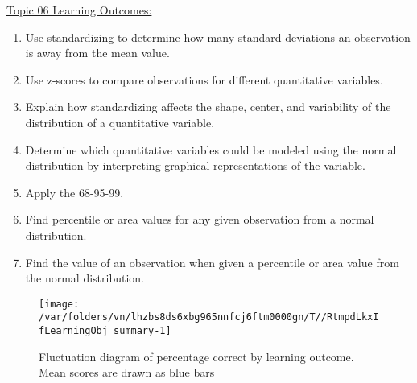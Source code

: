 \documentclass[12pt,english,nohyper]{tufte-handout}\usepackage[]{graphicx}\usepackage[]{color}
\newenvironment{knitrout}{}{} %
\begin{document}
\noindent
\underline{Topic 06 Learning Outcomes:}
\vspace{2mm}

\begin{fullwidth}
\begin{enumerate}[label=\Alph*.,itemsep=-\parsep,leftmargin=*]
  \item
Use standardizing to determine how many standard deviations an observation is away from the mean value.
\item Use z-scores to compare observations for different quantitative variables.
\item Explain how standardizing affects the shape, center, and variability of the distribution of a quantitative variable.
\item Determine which quantitative variables could be modeled using the normal distribution by interpreting graphical representations of the variable.
\item Apply the 68-95-99.
\item Find percentile or area values for any given observation from a normal distribution.
\item Find the value of an observation when given a percentile or area value from the normal distribution.

\end{enumerate}
\end{fullwidth}

\begin{knitrout}
\color{fgcolor}\begin{figure}
\texttt{[image: /var/folders/vn/lhzbs8ds6xbg965nnfcj6ftm0000gn/T//RtmpdLkxIfLearningObj\_summary-1]} \caption[Fluctuation diagram of percentage correct by learning outcome]{Fluctuation diagram of percentage correct by learning outcome. Mean scores are drawn as blue bars}\label{fig:LearningObj_summary}
\end{figure}


\end{knitrout}

\vspace{5mm}
\end{document}
